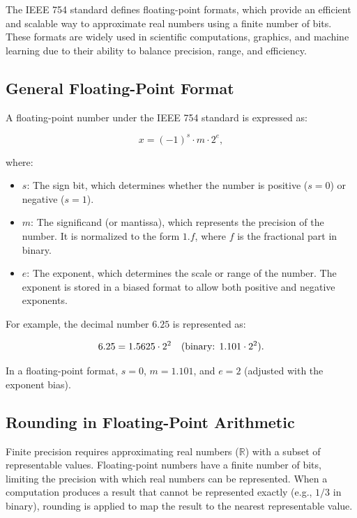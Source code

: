 The IEEE 754 standard defines floating-point formats, which provide an efficient and scalable way to approximate real numbers using a finite number of bits. These formats are widely used in scientific computations, graphics, and machine learning due to their ability to balance precision, range, and efficiency.

\subsection{General Floating-Point Format}
A floating-point number under the IEEE 754 standard \cite{ieee2008} is expressed as:

\[
x = (-1)^s \cdot m \cdot 2^e,
\]

where:
\begin{itemize}[noitemsep]
    \item \( s \): The sign bit, which determines whether the number is positive (\( s = 0 \)) or negative (\( s = 1 \)).
    \item \( m \): The significand (or mantissa), which represents the precision of the number. It is normalized to the form \( 1.f \), where \( f \) is the fractional part in binary.
    \item \( e \): The exponent, which determines the scale or range of the number. The exponent is stored in a biased format to allow both positive and negative exponents.
\end{itemize}

For example, the decimal number \( 6.25 \) is represented as:

\[
6.25 = 1.5625 \cdot 2^2 \quad \text{(binary: \( 1.101 \cdot 2^2 \))}.
\]

In a floating-point format, \( s = 0 \), \( m = 1.101 \), and \( e = 2 \) (adjusted with the exponent bias).

\subsection{Rounding in Floating-Point Arithmetic}
Finite precision requires approximating real numbers (\( \mathbb{R} \)) with a subset of representable values. Floating-point numbers have a finite number of bits, limiting the precision with which real numbers can be represented. When a computation produces a result that cannot be represented exactly (e.g., \( 1/3 \) in binary), rounding is applied to map the result to the nearest representable value.

